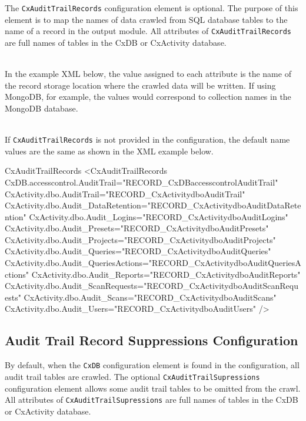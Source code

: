 The \texttt{CxAuditTrailRecords} configuration element is optional.  The purpose of this element is to map the names of data
crawled from SQL database tables to the name of a record in the output module.  All attributes of \texttt{CxAuditTrailRecords}
are full names of tables in the CxDB or CxActivity database.

\noindent\\In the example XML below, the value assigned to each attribute is the name of the record storage location where the crawled 
data will be written.  If using MongoDB, for example, the values would correspond to collection names in the MongoDB database.

\noindent\\If \texttt{CxAuditTrailRecords} is not provided in the configuration, the default name values are the same
as shown in the XML example below.

\begin{xml}{CxAuditTrailRecords}{}{}
<CxAuditTrailRecords
    CxDB.accesscontrol.AuditTrail="RECORD_CxDBaccesscontrolAuditTrail"
    CxActivity.dbo.AuditTrail="RECORD_CxActivitydboAuditTrail"
    CxActivity.dbo.Audit_DataRetention="RECORD_CxActivitydboAuditDataRetention"
    CxActivity.dbo.Audit_Logins="RECORD_CxActivitydboAuditLogins"
    CxActivity.dbo.Audit_Presets="RECORD_CxActivitydboAuditPresets"
    CxActivity.dbo.Audit_Projects="RECORD_CxActivitydboAuditProjects"
    CxActivity.dbo.Audit_Queries="RECORD_CxActivitydboAuditQueries"
    CxActivity.dbo.Audit_QueriesActions="RECORD_CxActivitydboAuditQueriesActions"
    CxActivity.dbo.Audit_Reports="RECORD_CxActivitydboAuditReports"
    CxActivity.dbo.Audit_ScanRequests="RECORD_CxActivitydboAuditScanRequests"
    CxActivity.dbo.Audit_Scans="RECORD_CxActivitydboAuditScans"
    CxActivity.dbo.Audit_Users="RECORD_CxActivitydboAuditUsers"
    />
\end{xml}


\subsection{Audit Trail Record Suppressions Configuration}

By default, when the \texttt{CxDB} configuration element is found in the configuration, all audit trail tables are crawled.  The
optional \texttt{CxAuditTrailSupressions} configuration element allows some audit trail tables to be omitted from the crawl. 
All attributes of \texttt{CxAuditTrailSupressions} are full names of tables in the CxDB or CxActivity database.

